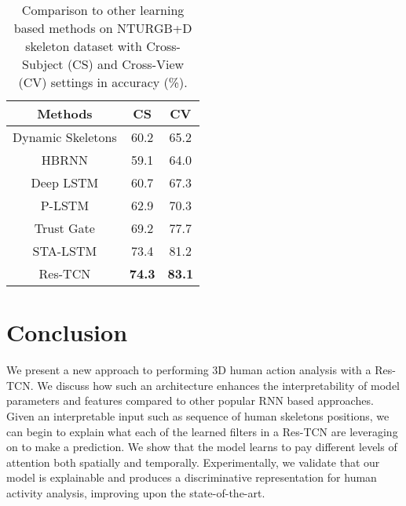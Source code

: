\documentclass[10pt,twocolumn,letterpaper]{article}
\begin{document}
\begin{table}[h!]
\centering
\caption{Comparison to other learning based methods on NTURGB+D skeleton dataset with Cross-Subject (CS) and Cross-View (CV) settings in accuracy (\%).}

\begin{tabular}{|c | c | c |} 
 \hline
 Methods & CS & CV  \\ [0.5ex] 
 \hline

 Dynamic Skeletons \cite{dynamic2015} & 60.2 & 65.2  \\
 HBRNN \cite{du2015} & 59.1 & 64.0  \\
 Deep LSTM \cite{nturgdb2016} & 60.7 & 67.3  \\
 P-LSTM \cite{nturgdb2016} & 62.9 & 70.3  \\
 Trust Gate \cite{Liu2016} & 69.2 & 77.7  \\
 STA-LSTM \cite{Song2017} & 73.4 & 81.2 \\
 \hline\hline
 Res-TCN & \textbf{74.3} & \textbf{83.1}  \\ [1ex] 
 \hline
\end{tabular}

\label{table:1}
\end{table}



\section{Conclusion}
We present a new approach to performing 3D human action analysis with a Res-TCN. We discuss how such an architecture enhances the interpretability of model parameters and features compared to other popular RNN based approaches. Given an interpretable input such as sequence of human skeletons positions, we can begin to explain what each of the learned filters in a Res-TCN are leveraging on to make a prediction. We show that the model learns to pay different levels of attention both spatially and temporally. Experimentally, we validate that our model is explainable and produces a discriminative representation for human activity analysis, improving upon the state-of-the-art. 

{\small


}
\end{document}
